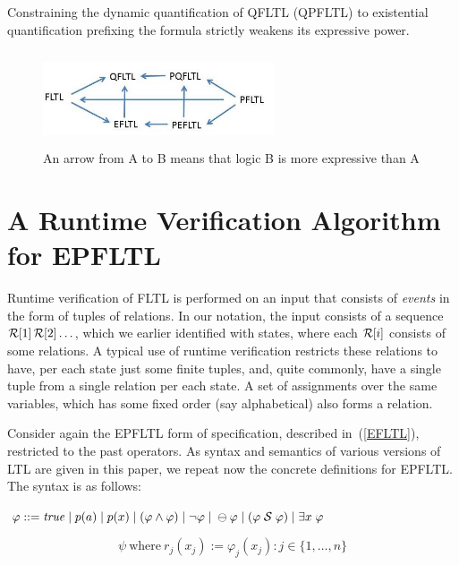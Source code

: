 \begin{corollary}
Constraining the dynamic quantification of QFLTL (QPFLTL) to existential quantification prefixing the
formula strictly weakens its expressive power.
\end{corollary}



\begin{figure}
\begin{center}
\includegraphics[height=1.1in,width=2.7in]{FIRST.jpg}
\caption{\label{fsfr} An arrow from A to B means that logic  B is more expressive than A}
\end{center}
\end{figure}


\section{A Runtime Verification Algorithm for EPFLTL}
\label{EPLTLRV}

Runtime verification of FLTL is performed on an
input that consists of {\em events} in the form of
tuples of relations. In our notation, the input
consists of a sequence ${\cal R}[1] \, {\cal R}[2]  \ldots$,
which we earlier identified with states, where each
${\cal R}[i]$ consists of some relations. A typical use
of runtime verification restricts these relations to have,
per each state just some finite tuples, and, quite commonly, have a single tuple from a single relation per each state.
A set of assignments over the same variables, which has some fixed order
(say alphabetical) also forms a relation.

Consider again the EPFLTL form
of specification, described in~(\ref{EFLTL}), restricted to the past operators. As syntax and semantics of various versions
of LTL are given in this paper, we repeat now the concrete definitions for EPFLTL. The syntax is as follows:


\begin{center}
$\varphi ::= \mathit{true}  \; | \;
    p ( a ) \; | \;
    p ( x ) \; | \;
    ( \varphi \wedge \varphi ) \;  |   \;
   \neg \varphi \; | \;
    \ominus \varphi \; | \;
    ( \varphi  \; {\cal S}  \; \varphi ) \; | \;
    \exists x \; \varphi$
\end{center}
\[ 
\psi \mathrm{\ where\ } r_j ( x_j) := 
\varphi_j (x_j) : j \in \{ 1 , \ldots , n \}
\]


